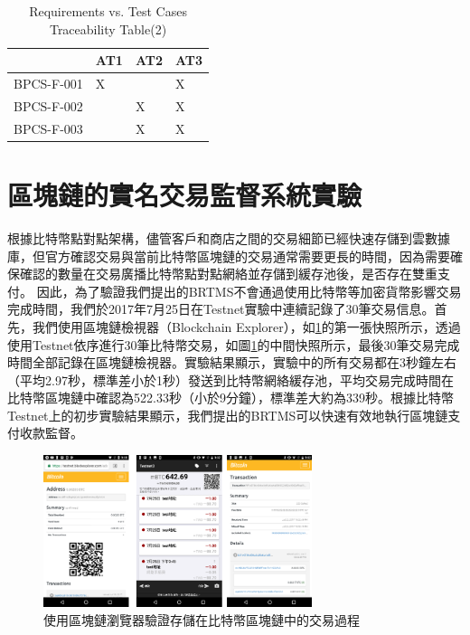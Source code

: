 				\begin{table}[htbp]
				\centering
				\caption{Requirements vs. Test Cases Traceability Table(2)}
				\label{table12}
				\begin{tabular}{@{}llll@{}}
				\toprule
				           & AT1 & AT2 & AT3 \\ \midrule
				BPCS-F-001 & X   &     & X   \\
				BPCS-F-002 &     & X   & X   \\
				BPCS-F-003 &     & X   & X   \\ \bottomrule
				\end{tabular}
				\end{table}









	\section{區塊鏈的實名交易監督系統實驗}
	根據比特幣點對點架構，儘管客戶和商店之間的交易細節已經快速存儲到雲數據庫，但官方確認交易與當前比特幣區塊鏈的交易通常需要更長的時間，因為需要確保確認的數量在交易廣播比特幣點對點網絡並存儲到緩存池後，是否存在雙重支付。
	因此，為了驗證我們提出的BRTMS不會通過使用比特幣等加密貨幣影響交易完成時間，我們於2017年7月25日在Testnet實驗中連續記錄了30筆交易信息。首先，我們使用區塊鏈檢視器（Blockchain Explorer）\supercite{Blockchainexplorer:Ananalyticalprocessandinvestigationenvironmentforbitcoin}，如\ref{fig9}的第一張快照所示，透過使用Testnet依序進行30筆比特幣交易，如圖\ref{fig9}的中間快照所示，最後30筆交易完成時間全部記錄在區塊鏈檢視器。實驗結果顯示，實驗中的所有交易都在3秒鐘左右（平均2.97秒，標準差小於1秒）發送到比特幣網絡緩存池，平均交易完成時間在比特幣區塊鏈中確認為522.33秒（小於9分鐘），標準差大約為339秒。根據比特幣Testnet上的初步實驗結果顯示，我們提出的BRTMS可以快速有效地執行區塊鏈支付收款監督。

	\begin{figure}[htbp]
		\centering
		\includegraphics[width = 0.7\textwidth]{fig9.png}
		\caption{使用區塊鏈瀏覽器驗證存儲在比特幣區塊鏈中的交易過程}\label{fig9}
	\end{figure}

